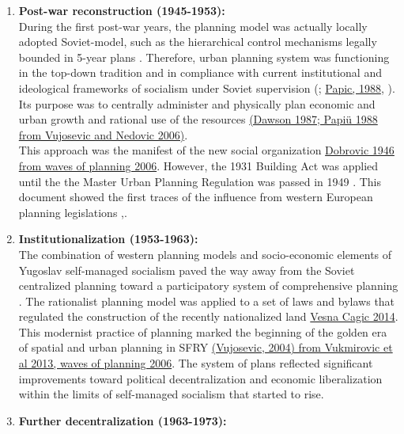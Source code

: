 \documentclass[11pt]{report}
\begin{document}
\begin{enumerate}
\item \textbf{Post-war reconstruction (1945-1953):}
\\
During the first post-war years, the planning model was actually locally adopted Soviet-model, such as the hierarchical  control  mechanisms legally bounded in 5-year plans \href{}{\citealt{vujosevic_planning_2006}}.
Therefore, urban planning system was functioning in the top-down tradition and in compliance with current institutional and ideological frameworks of socialism under Soviet supervision (\href{}{\citealt{dawson_yugoslavia_1987}}; \href{}{Papic, 1988}, \href{}{\citealt{peric_evolution_2016}}).
Its purpose was to centrally administer and physically plan economic and urban growth and rational use of the resources \href{}{(Dawson  1987; Papiü 1988 from Vujosevic and Nedovic 2006)}. 
\\

This approach was the manifest of the new social organization \href{}{Dobrovic 1946 from waves of planning 2006}.
However, the 1931 Building Act was applied until the the Master Urban Planning Regulation was passed in 1949 \href{}{\citealt{nedovicbudic_waves_2006}}.
This document showed the first traces of the influence from western European planning legislations \href{}{\citealt{peric_evolution_2016}},\href{}{\citealt{nedovicbudic_waves_2006}}.

\item \textbf{Institutionalization (1953-1963):}
\\
The combination of western planning models and socio-economic elements of Yugoslav self-managed socialism paved the way away from the Soviet centralized planning toward a participatory system of comprehensive planning
\href{}{\citealt{nedovic-budic_mornings_2011}}.
The rationalist planning model was applied to a set of laws and bylaws that regulated the construction of the recently nationalized land \href{}{Vesna Cagic 2014}.
This modernist practice of planning marked the beginning of the golden era of spatial and urban planning in SFRY
\href{}{(Vujosevic, 2004) from Vukmirovic et al 2013, waves of planning 2006}.
The system of plans reflected significant improvements toward political decentralization and economic liberalization within the limits of self-managed socialism that started to rise\href{}{\citealt{peric_evolution_2016}}.

\item \textbf{Further decentralization (1963-1973):}


\end{enumerate}
\end{document}
